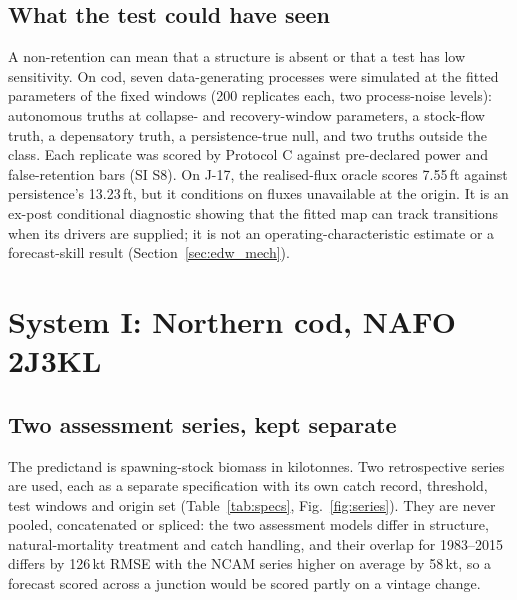 \documentclass[preprint,11pt,authoryear]{elsarticle}
\theoremstyle{definition}
\theoremstyle{remark}
\begin{document}
\subsection{What the test could have seen}\label{sec:power}

A non-retention can mean that a structure is absent or that a test has low sensitivity. On cod, seven data-generating processes were simulated at the fitted parameters of the fixed windows (200 replicates each, two process-noise levels): autonomous truths at collapse- and recovery-window parameters, a stock-flow truth, a depensatory truth, a persistence-true null, and two truths outside the class. Each replicate was scored by Protocol C against pre-declared power and false-retention bars (SI S8). On J-17, the realised-flux oracle scores 7.55\,ft against persistence's 13.23\,ft, but it conditions on fluxes unavailable at the origin. It is an ex-post conditional diagnostic showing that the fitted map can track transitions when its drivers are supplied; it is not an operating-characteristic estimate or a forecast-skill result (Section~\ref{sec:edw_mech}).
\FloatBarrier
\section{System I: Northern cod, NAFO 2J3KL}\label{sec:cod}

\subsection{Two assessment series, kept separate}\label{sec:specs}

The predictand is spawning-stock biomass in kilotonnes. Two retrospective series are used, each as a separate specification with its own catch record, threshold, test windows and origin set (Table~\ref{tab:specs}, Fig.~\ref{fig:series}). They are never pooled, concatenated or spliced: the two assessment models differ in structure, natural-mortality treatment and catch handling, and their overlap for 1983--2015 differs by 126\,kt RMSE with the NCAM series higher on average by 58\,kt, so a forecast scored across a junction would be scored partly on a vintage change.
\end{document}
